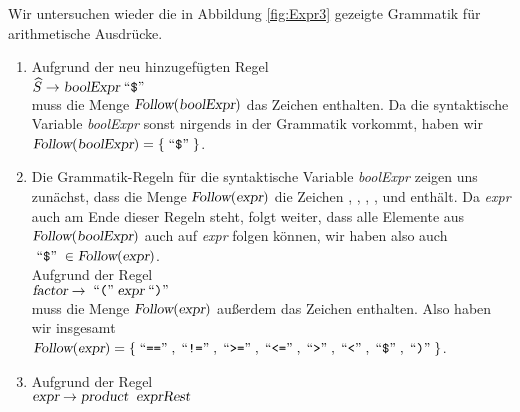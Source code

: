 \example
Wir untersuchen wieder die in Abbildung \ref{fig:Expr3} gezeigte Grammatik für arithmetische Ausdrücke.
\begin{enumerate}
\item Aufgrund der neu hinzugefügten Regel
      \\[0.2cm]
      \hspace*{1.3cm}
      $\widehat{S} \rightarrow \textsl{boolExpr} \quoted{\symbol{36}}$
      \\[0.2cm]
      muss die Menge $\textsl{Follow}(\textsl{boolExpr})$ das Zeichen 
      enthalten.  Da die syntaktische Variable \textsl{boolExpr} sonst nirgends in der
      Grammatik vorkommt, haben wir 
      \\[0.2cm]
      \hspace*{1.3cm}
      $\textsl{Follow}(\textsl{boolExpr}) = \{ \quoted{\symbol{36}} \}$.
\item Die Grammatik-Regeln für die syntaktische Variable \textsl{boolExpr}
      zeigen uns zunächst, dass die Menge $\textsl{Follow}(\textsl{expr})$ die Zeichen
      \qote{==}, \qote{!=}, \qote{<=}, \qote{>=}, \qote{<}   und \qote{>} enthält.  Da \textsl{expr} auch am Ende dieser Regeln steht,
      folgt weiter, dass alle Elemente aus $\textsl{Follow}(\textsl{boolExpr})$ auch auf 
      \textsl{expr} folgen können, wir haben also auch
      \\[0.2cm]
      \hspace*{1.3cm}
      $\quoted{\symbol{36}} \in \textsl{Follow}(\textsl{expr})$.
      \\[0.2cm]
      Aufgrund der Regel 
      \\[0.2cm]
      \hspace*{1.3cm}
      $\textsl{factor} \rightarrow \;\mbox{``\texttt{(}''}\; \textsl{expr} \;\mbox{``\texttt{)}''}\;$
      \\[0.2cm]
      muss die Menge $\textsl{Follow}(\textsl{expr})$ außerdem das Zeichen \qote{)}
      enthalten.  Also haben wir insgesamt
      \\[0.2cm]
      \hspace*{1.3cm}
      $\textsl{Follow}(\textsl{expr}) = \{ \quoted{==}, \quoted{!=}, \quoted{>=}, \quoted{<=}, \quoted{>}, \quoted{<}, \quoted{\symbol{36}}, \quoted{)} \}$.
\item Aufgrund der Regel 
      \\[0.2cm]
      \hspace*{1.3cm}
      $\textsl{expr} \rightarrow \textsl{product}\;\;\textsl{exprRest}$
      \\[0.2cm]      

\end{enumerate}
